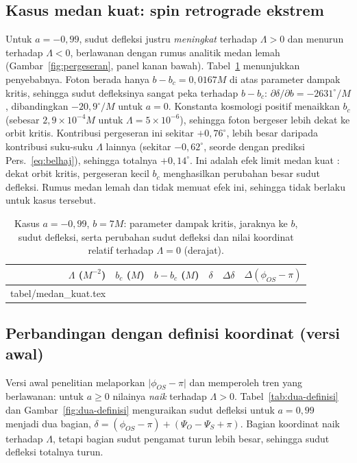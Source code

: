 \documentclass[11pt,a4paper]{article}
\makeatletter
\newcommand{\isitabel}[1]{\@@input #1 }
\makeatother
\begin{document}
\FloatBarrier
\subsection{Kasus medan kuat: spin retrograde ekstrem}
\label{subsec:medan-kuat}

Untuk $a = -0{,}99$, sudut defleksi justru \emph{meningkat} terhadap $\Lambda > 0$ dan menurun terhadap
$\Lambda < 0$, berlawanan dengan rumus analitik medan lemah (Gambar~\ref{fig:pergeseran}, panel kanan
bawah). Tabel~\ref{tab:medan-kuat} menunjukkan penyebabnya. Foton berada hanya $b - b_c = 0{,}0167M$ di atas
parameter dampak kritis, sehingga sudut defleksinya sangat peka terhadap $b - b_c$:
$\partial\delta/\partial b = -2631^\circ/M$, dibandingkan $-20{,}9^\circ/M$ untuk $a = 0$. Konstanta
kosmologi positif menaikkan $b_c$ (sebesar $2{,}9\times10^{-4}M$ untuk $\Lambda = 5\times10^{-6}$), sehingga
foton bergeser lebih dekat ke orbit kritis. Kontribusi pergeseran ini sekitar $+0{,}76^\circ$, lebih besar
daripada kontribusi suku-suku $\Lambda$ lainnya (sekitar $-0{,}62^\circ$, seorde dengan prediksi
Pers.~\eqref{eq:belhaj}), sehingga totalnya $+0{,}14^\circ$. Ini adalah efek limit medan kuat
\citep{bozza2002gravitational}: dekat orbit kritis, pergeseran kecil $b_c$ menghasilkan perubahan besar
sudut defleksi. Rumus medan lemah \citet{belhaj2022light} dan \citet{huang2025influence} tidak memuat efek
ini, sehingga tidak berlaku untuk kasus tersebut.

\begin{table}[t]
  \centering
  \small
  \caption{Kasus $a = -0{,}99$, $b = 7M$: parameter dampak kritis, jaraknya ke $b$, sudut defleksi, serta
    perubahan sudut defleksi dan nilai koordinat relatif terhadap $\Lambda = 0$ (derajat).}
  \label{tab:medan-kuat}
  \begin{tabular}{rrrrrr}
    \toprule
    $\Lambda$ ($M^{-2}$) & $b_c$ ($M$) & $b - b_c$ ($M$) & $\delta$ & $\Delta\delta$ & $\Delta(\phi_{OS} - \pi)$ \\
    \midrule
    \isitabel{tabel/medan_kuat.tex}
    \bottomrule
  \end{tabular}
\end{table}

\FloatBarrier
\subsection{Perbandingan dengan definisi koordinat (versi awal)}
\label{subsec:dua-definisi}

Versi awal penelitian melaporkan $\lvert\phi_{OS} - \pi\rvert$ dan memperoleh tren yang berlawanan: untuk
$a \ge 0$ nilainya \emph{naik} terhadap $\Lambda > 0$. Tabel~\ref{tab:dua-definisi} dan
Gambar~\ref{fig:dua-definisi} menguraikan sudut defleksi untuk $a = 0{,}99$ menjadi dua bagian,
$\delta = (\phi_{OS} - \pi) + (\Psi_O - \Psi_S + \pi)$. Bagian koordinat naik terhadap $\Lambda$, tetapi bagian
sudut pengamat turun lebih besar, sehingga sudut defleksi totalnya turun.
\end{document}
